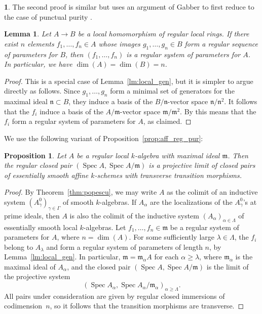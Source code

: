 \documentclass[11pt]{article}
\numberwithin{equation}{section}\renewcommand{\encodingdefault}{TU}
\DeclareMathOperator{\spec}{Spec}
\newtheorem{prop}[thm]{Proposition}
\newtheorem{lm}[thm]{Lemma}
\theoremstyle{remark}
\theoremstyle{definition}
\newtheorem{num}[thm]{}
\numberwithin{equation}{thm}
\begin{document}
\begin{num}
The second proof is similar but uses an argument of Gabber to first reduce to the case of punctual purity \cite[XVI\,3.2]{Gabber}.

\begin{lm}\label{lm:local_gen_max}
Let $A \to B$ be a local homomorphism of regular local rings.
If there exist $n$ elements $f_1,\ldots,f_n \in A$ whose images $g_1,\ldots,g_n \in B$ form a regular sequence of parameters for $B$, then $(f_1,\ldots,f_n)$ is a regular system of parameters for $A$.
In particular, we have $\dim(A) = \dim(B) = n$.
\end{lm}

\begin{proof}
This is a special case of Lemma~\ref{lm:local_gen}, but it is simpler to argue directly as follows.
Since $g_1,\ldots,g_n$ form a minimal set of generators for the maximal ideal $\mathfrak{n} \subset B$, they induce a basis of the $B/\mathfrak{n}$-vector space $\mathfrak{n}/\mathfrak{n}^2$.
It follows that the $f_i$ induce a basis of the $A/\mathfrak{m}$-vector space $\mathfrak{m}/\mathfrak{m}^2$.
By \cite[0, Prop.\,17.1.7]{EGA4} this means that the $f_i$ form a regular system of parameters for $A$, as claimed.
\end{proof}

We use the following variant of Proposition~\ref{prop:aff_reg_pur}:
\begin{prop}
\label{prop:local_pur}
Let $A$ be a regular local $k$-algebra with maximal ideal $\mathfrak{m}$. Then the regular closed pair $(\spec A, \spec A/\mathfrak{m})$ is a projective limit of closed pairs of essentially smooth affine $k$-schemes with transverse transition morphisms.
\end{prop}
\begin{proof}
By Theorem~\ref{thm:popescu}, we may write $A$ as the colimit of an inductive system $(A^0_\gamma)_{\gamma\in\Gamma}$ of smooth $k$-algebras.
If $A_\alpha$ are the localizations of the $A^0_\gamma$'s at prime ideals, then $A$ is also the colimit of the inductive system $(A_\alpha)_{\alpha\in\Lambda}$ of essentially smooth local $k$-algebras.
Let $f_1,\ldots,f_n \in \mathfrak{m}$ be a regular system of parameters for $A$, where $n = \dim(A)$.
For some sufficiently large $\lambda\in\Lambda$, the $f_i$ belong to $A_\lambda$ and form a regular system of parameters of length $n$, by Lemma~\ref{lm:local_gen}.
In particular, $\mathfrak{m} = \mathfrak{m}_\alpha A$ for each $\alpha\geqslant\lambda$, where $\mathfrak{m}_\alpha$ is the maximal ideal of $A_\alpha$, and the closed pair $(\spec{A}, \spec{A}/\mathfrak{m})$ is the limit of the projective system
\begin{equation*}
(\spec{A_\alpha}, \spec{A_\alpha}/\mathfrak{m}_\alpha)_{\alpha\geqslant\Lambda}.
\end{equation*}
All pairs under consideration are given by regular closed immersions of codimension~$n$, so it follows that the transition morphisms are transverse.
\end{proof}


\end{num}
\end{document}
